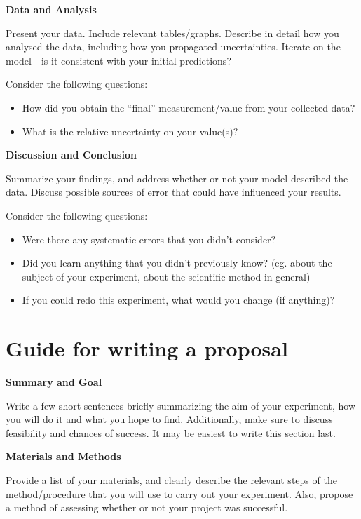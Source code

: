 \textbf{Data and Analysis}

Present your data. Include relevant tables/graphs. Describe in detail how you analysed the data, including how you propagated uncertainties. Iterate on the model - is it consistent with your initial predictions?

Consider the following questions:
\begin{itemize}
\item How did you obtain the ``final'' measurement/value from your collected data?
\item What is the relative uncertainty on your value(s)?
\end{itemize}

\textbf{Discussion and Conclusion}

Summarize your findings, and address whether or not your model described the data. Discuss possible sources of error that could have influenced your results.

Consider the following questions:
\begin{itemize}
\item Were there any systematic errors that you didn't consider?
\item Did you learn anything that you didn't previously know? (eg. about the subject of your experiment, about the scientific method in general)
\item If you could redo this experiment, what would you change (if anything)?
\end{itemize}

\newpage
\section{Guide for writing a proposal}
 \vspace{0.25cm}
\textbf{Summary and Goal}

Write a few short sentences briefly summarizing the aim of your experiment, how you will do it and what you hope to find. Additionally, make sure to discuss feasibility and chances of success. It may be easiest to write this section last.

\textbf{Materials and Methods}

Provide a list of your materials, and clearly describe the relevant steps of the method/procedure that you will use to carry out your experiment. Also, propose a method of assessing whether or not your project was successful. 

